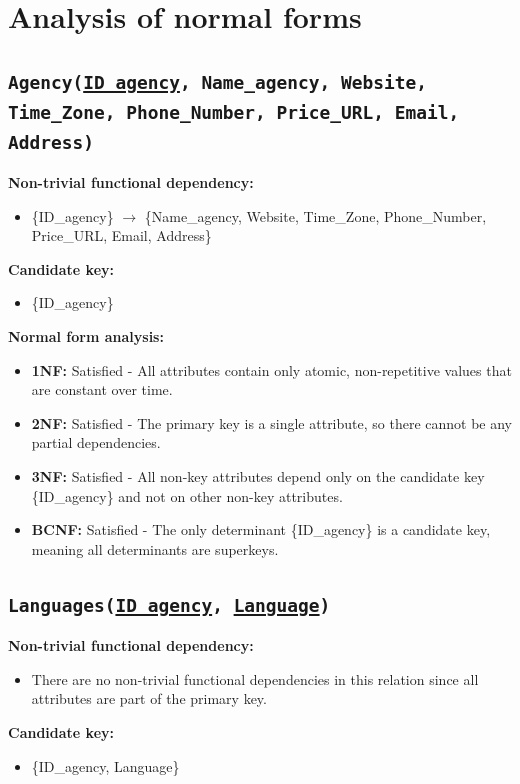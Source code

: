 \documentclass[a4paper, 12pt]{article}
\begin{document}
\newpage

\section{Analysis of normal forms} \label{sec:6}

\subsection{\texttt{Agency(\underline{ID\_agency}, Name\_agency, Website, Time\_Zone, Phone\_Number, Price\_URL, Email, Address)}}

\textbf{Non-trivial functional dependency:}
\begin{itemize}
    \item \{ID\_agency\} $\rightarrow$ \{Name\_agency, Website, Time\_Zone, Phone\_Number, Price\_URL, Email, Address\}
\end{itemize}

\textbf{Candidate key:}
\begin{itemize}
    \item \{ID\_agency\}
\end{itemize}

\textbf{Normal form analysis:}
\begin{itemize}
    \item \textbf{1NF:} Satisfied - All attributes contain only atomic, non-repetitive values that are constant over time.
    
    \item \textbf{2NF:} Satisfied - The primary key is a single attribute, so there cannot be any partial dependencies.
    
    \item \textbf{3NF:} Satisfied - All non-key attributes depend only on the candidate key \{ID\_agency\} and not on other non-key attributes.
    
    \item \textbf{BCNF:} Satisfied - The only determinant \{ID\_agency\} is a candidate key, meaning all determinants are superkeys.
\end{itemize}

\subsection{\texttt{Languages(\underline{ID\_agency}, \underline{Language})}}
\textbf{Non-trivial functional dependency:}
\begin{itemize}
    \item There are no non-trivial functional dependencies in this relation since all attributes are part of the primary key.
\end{itemize}
\textbf{Candidate key:}
\begin{itemize}
    \item \{ID\_agency, Language\}
\end{itemize}
\end{document}
